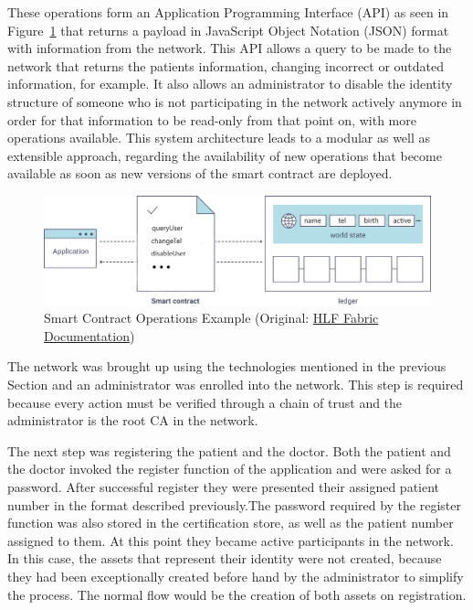 These operations form an Application Programming Interface (API) as seen in
Figure~\ref{fig:smartContractOverview} that returns a payload in JavaScript
Object Notation (JSON) format with information from the network. This API
allows a query to be made to the network that returns the patients information,
changing incorrect or outdated information, for example. It also allows an
administrator to disable the identity structure of someone who is not
participating in the network actively anymore in order for that information to
be read-only from that point on, with more operations available. This system
architecture leads to a modular as well as extensible approach, regarding the
availability of new operations that become available as soon as new versions of
the smart contract are deployed.  

\begin{figure}[ht] 
  \centering
  \includegraphics[width=0.9\linewidth]{imgs/smartContractOverview.png}
  \caption{\label{fig:smartContractOverview}Smart Contract Operations Example
  (Original:
  \href{http://hyperledger-fabric.readthedocs.io/en/latest/write_first_app.html}{HLF
  Fabric Documentation})} 
\end{figure}

The network was brought up using the technologies mentioned in the previous
Section and an administrator was enrolled into the network. This step is
required because every action must be verified through a chain of trust and the
administrator is the root CA in the network.

The next step was registering the patient and the doctor. Both the patient and
the doctor invoked the register function of the application and were asked for
a password. After successful register they were presented their assigned
patient number in the format described previously.The password required by the
register function was also stored in the certification store, as well as the
patient number assigned to them. At this point they became active participants
in the network. In this case, the assets that represent their identity were not
created, because they had been exceptionally created before hand by the
administrator to simplify the process. The normal flow would be the creation of
both assets on registration.

